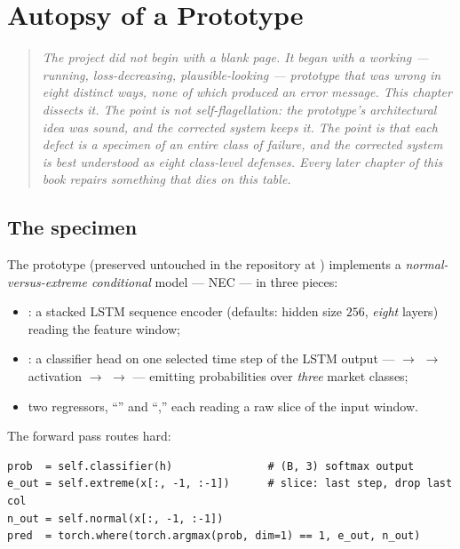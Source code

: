 \chapter{Autopsy of a Prototype}\label{ch:autopsy}

\begin{quote}\small\itshape
The project did not begin with a blank page. It began with a working ---
running, loss-decreasing, plausible-looking --- prototype that was wrong in
eight distinct ways, none of which produced an error message. This chapter
dissects it. The point is not self-flagellation: the prototype's
\emph{architectural idea} was sound, and the corrected system keeps it. The
point is that each defect is a specimen of an entire \emph{class} of failure,
and the corrected system is best understood as eight class-level defenses.
Every later chapter of this book repairs something that dies on this table.
\end{quote}

\section{The specimen}\label{sec:specimen}

The prototype (preserved untouched in the repository at
) implements a
\emph{normal-versus-extreme conditional} model --- NEC --- in three pieces:

\begin{itemize}[leftmargin=2em]
\item {}: a stacked LSTM sequence encoder (defaults: hidden size
  $256$, \emph{eight} layers) reading the feature window;
\item {}: a classifier head on one selected time step of the LSTM
  output ---  $\to$  $\to$ activation $\to$
   $\to$  --- emitting probabilities over
  \emph{three} market classes;
\item two  regressors, ``'' and
  ``,'' each reading a raw slice of the input window.
\end{itemize}

The forward pass routes hard:

\begin{lstlisting}
prob  = self.classifier(h)               # (B, 3) softmax output
e_out = self.extreme(x[:, -1, :-1])      # slice: last step, drop last col
n_out = self.normal(x[:, -1, :-1])
pred  = torch.where(torch.argmax(prob, dim=1) == 1, e_out, n_out)
\end{lstlisting}

